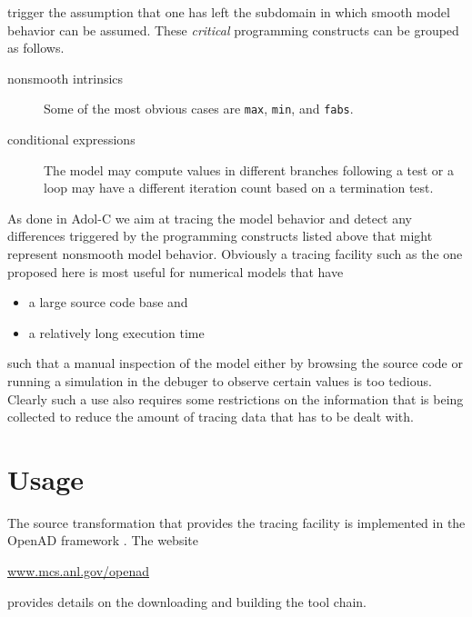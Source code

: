 \documentclass{article}
\newcommand{\code}[1]{{\tt{#1}}}
\begin{document}
trigger the assumption that one has left the subdomain in which smooth model behavior 
can be assumed. 
These {\em critical} programming constructs can be grouped as follows.
\begin{description}
\item[nonsmooth intrinsics] Some of the most obvious cases are \code{max}, \code{min}, and \code{fabs}.
\item[conditional expressions] The model may compute values in different branches following a test 
or a loop may have a different iteration count based on a termination test.
\end{description}
As done in Adol-C we aim at tracing the model behavior and detect any differences triggered 
by the programming constructs listed above that might represent nonsmooth model behavior.
Obviously a tracing facility such as the one proposed here is most useful for 
numerical models that have 
\begin{itemize}
\item a large source code base and 
\item a relatively long execution time
\end{itemize}
such that a manual inspection of the model either by browsing the source code or 
running a simulation in the debuger to observe certain values is too tedious.
Clearly such a use also requires some restrictions on the information that is being 
collected to reduce the amount of tracing data that has to be dealt with.


\section{Usage}

The source transformation that provides the tracing facility is implemented in the 
OpenAD framework \cite{openad}. The website 
\centerline{\url{www.mcs.anl.gov/openad}}
provides details on the downloading and building the tool chain. 
\end{document}
